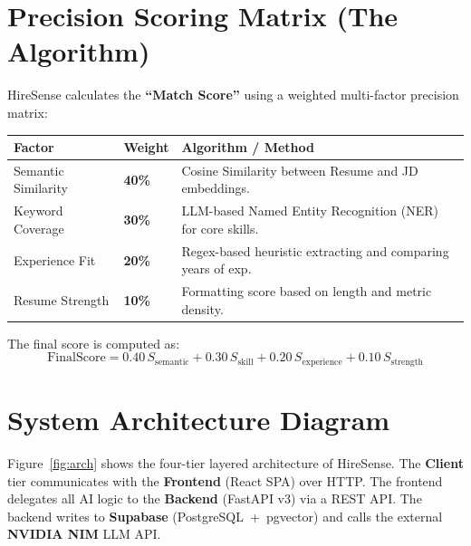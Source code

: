 \documentclass[12pt, a4paper]{article}
\begin{document}
\section{Precision Scoring Matrix (The Algorithm)}

HireSense calculates the \textbf{``Match Score''} using a weighted multi-factor precision matrix:

\begingroup
\setlength{\tabcolsep}{8pt}
\renewcommand{\arraystretch}{1.4}
\begin{tabularx}{\linewidth}{@{}L{3.5cm} C{2cm} X@{}}
    \toprule
    \textbf{Factor} & \textbf{Weight} & \textbf{Algorithm / Method} \\
    \midrule
    Semantic Similarity & \textbf{40\%} & Cosine Similarity between Resume and JD embeddings. \\
    Keyword Coverage    & \textbf{30\%} & LLM-based Named Entity Recognition (NER) for core skills. \\
    Experience Fit      & \textbf{20\%} & Regex-based heuristic extracting and comparing years of exp. \\
    Resume Strength     & \textbf{10\%} & Formatting score based on length and metric density. \\
    \bottomrule
\end{tabularx}
\endgroup

\vspace{6pt}
The final score is computed as:
\[
    \text{FinalScore} = 0.40\,S_{\text{semantic}} + 0.30\,S_{\text{skill}} + 0.20\,S_{\text{experience}} + 0.10\,S_{\text{strength}}
\]

\section{System Architecture Diagram}

Figure~\ref{fig:arch} shows the four-tier layered architecture of HireSense.
The \textbf{Client} tier communicates with the \textbf{Frontend} (React SPA) over HTTP.
The frontend delegates all AI logic to the \textbf{Backend} (FastAPI v3) via a REST API.
The backend writes to \textbf{Supabase} (PostgreSQL~+~pgvector) and calls the external \textbf{NVIDIA NIM} LLM API.
\end{document}
